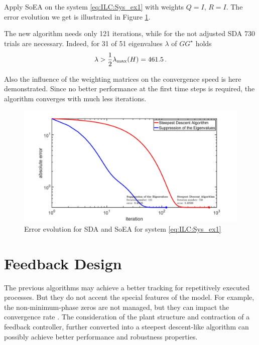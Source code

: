 \begin{exam}
    Apply SoEA on the system \eqref{eq:ILC:Sys_ex1} with weights $Q = I$, $R = I$.  
	The error evolution we get is illustrated in Figure \ref{img:ILC:Ex1_SDAvsSoE}.
	
	The new algorithm needs only 121 iterations, while for the not adjusted SDA 730 trials are necessary. Indeed, for 31 of 51 eigenvalues $\lambda$ of $G G^\star$ holds 
	\begin{align}
	\lambda > \frac{1}{2}\lambda_{\mathrm{max}}(H) = 461.5 \, .
	\end{align}
	
	Also the influence of the weighting matrices on the convergence speed is here demonstrated. 
	Since no better performance at the first time steps is required, the algorithm converges with much less iterations. 
	   		
	\begin{figure}[ht]
		\centering
		\includegraphics[width=\textwidth]{fig/Ex1_SDAvsSoE.jpg}
		\caption{Error evolution for SDA and SoEA for system \eqref{eq:ILC:Sys_ex1}}
		\label{img:ILC:Ex1_SDAvsSoE}
	\end{figure}
	
\end{exam}

\section{Feedback Design}

The previous algorithms may achieve a better tracking for repetitively executed processes.  But they do not accent the special features of the model. For example, the non-minimum-phase zeros are not managed, but they can impact the convergence rate \cite{ILC}. 
The consideration of the plant structure and contraction of a feedback controller, further converted into a steepest descent-like algorithm can possibly  achieve better performance and robustness properties. 

